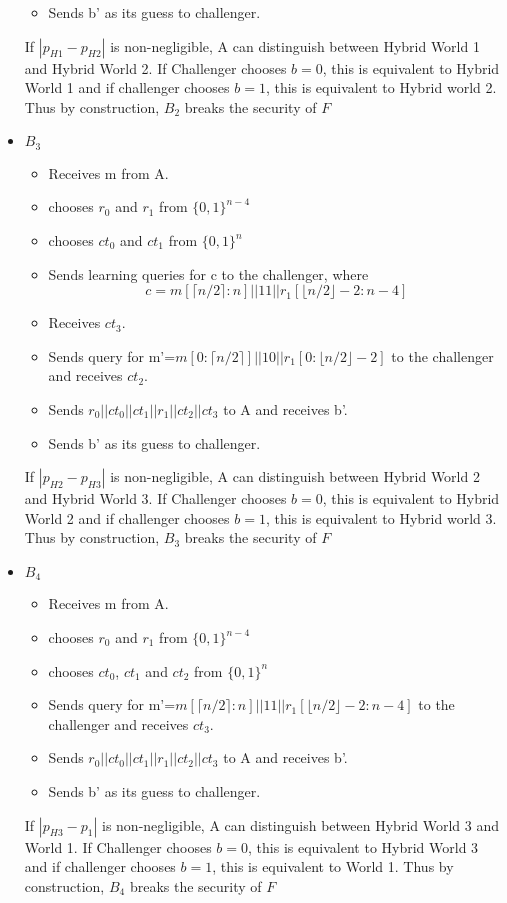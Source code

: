 \documentclass{article}
\begin{document}
\begin{itemize}
\begin{itemize}
        \item Sends b' as its guess to challenger.
    \end{itemize}
    If $|p_{H1}-p_{H2}|$ is non-negligible, A can distinguish between Hybrid World 1 and Hybrid World 2. If Challenger chooses $b=0$, this is equivalent to Hybrid World 1 and if challenger chooses $b=1$, this is equivalent to Hybrid world 2. Thus by construction, $B_2$ breaks the security of $F$
    \item $B_3$
    \begin{itemize}
        \item Receives m from A.
        \item chooses $r_0$ and $r_1$ from $\{0,1\}^{n-4}$
        \item chooses $ct_0$ and $ct_1$ from $\{0,1\}^n$
        \item Sends learning queries for c to the challenger, where
        \[c=m[\lceil n/2 \rceil:n ]\big|\big|11\big|\big|r_1[\lfloor n/2 \rfloor -2:n-4]\]
        \item Receives $ct_3$.
        \item Sends query for m'=$m[0:\lceil n/2 \rceil ]\big|\big|10\big|\big|r_1[0:\lfloor n/2 \rfloor -2]$ to the challenger and receives $ct_2$.
        \item Sends $r_0||ct_0||ct_1||r_1||ct_2||ct_3$ to A and receives b'.
        \item Sends b' as its guess to challenger.
    \end{itemize}
    If $|p_{H2}-p_{H3}|$ is non-negligible, A can distinguish between Hybrid World 2 and Hybrid World 3. If Challenger chooses $b=0$, this is equivalent to Hybrid World 2 and if challenger chooses $b=1$, this is equivalent to Hybrid world 3. Thus by construction, $B_3$ breaks the security of $F$
    \item $B_4$
    \begin{itemize}
        \item Receives m from A.
        \item chooses $r_0$ and $r_1$ from $\{0,1\}^{n-4}$
        \item chooses $ct_0$, $ct_1$ and $ct_2$ from $\{0,1\}^n$
        \item Sends query for m'=$m[\lceil n/2 \rceil:n ]\big|\big|11\big|\big|r_1[\lfloor n/2 \rfloor -2:n-4]$ to the challenger and receives $ct_3$.
        \item Sends $r_0||ct_0||ct_1||r_1||ct_2||ct_3$ to A and receives b'.
        \item Sends b' as its guess to challenger.
    \end{itemize}
    If $|p_{H3}-p_1|$ is non-negligible, A can distinguish between Hybrid World 3 and World 1. If Challenger chooses $b=0$, this is equivalent to Hybrid World 3 and if challenger chooses $b=1$, this is equivalent to World 1. Thus by construction, $B_4$ breaks the security of $F$
\end{itemize}
\end{document}
